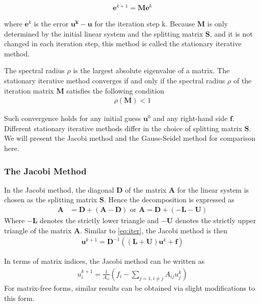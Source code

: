 \begin{align}
    \boldsymbol{e}^{k+1} = \boldsymbol{M} \boldsymbol{e}^k
\end{align}

where $\boldsymbol{e}^k$ is the error $\boldsymbol{u^k} - \boldsymbol{u}$ for the iteration step k. Because $\boldsymbol{M}$ is only determined by the initial linear system and the splitting matrix $\boldsymbol{S}$, and it is not changed in each iteration step, this method is called the stationary iterative method. 

The spectral radius $\rho$ is the largest absolute eigenvalue of a matrix. The stationary iterative method converges if and only if the spectral radius $\rho$ of the iteration matrix $\boldsymbol{M}$ satisfies the following condition
\begin{align}
    \rho(\boldsymbol{M}) < 1
\end{align}

Such convergence holds for any initial guess $\boldsymbol{u}^0$ and any right-hand side $\boldsymbol{f}$. Different stationary iterative methods differ in the choice of splitting matrix $\boldsymbol{S}$. We will present the Jacobi method and the Gauss-Seidel method for comparison here.


\subsubsection{The Jacobi Method}
In the Jacobi method, the diagonal $\boldsymbol{D}$ of the matrix $\boldsymbol{A}$ for the linear system is chosen as the splitting matrix $\boldsymbol{S}$. Hence the decomposition is expressed as
\begin{align}
    \boldsymbol{A} &= \boldsymbol{D} + (\boldsymbol{A} - \boldsymbol{D})  \text{ or } \boldsymbol{A} = \boldsymbol{D} + (-\boldsymbol{L} - \boldsymbol{U})
\end{align}
Where $-\boldsymbol{L}$ denotes the strictly lower triangle and $-\boldsymbol{U}$ denotes the strictly upper triangle of the matrix $\boldsymbol{A}$. Similar to \autoref{eq:iter}, the Jacobi method is then
\begin{align}
    \boldsymbol{u}^{k+1} = \boldsymbol{D}^{-1}((\boldsymbol{L} + \boldsymbol{U})\boldsymbol{u}^k + \boldsymbol{f})
\end{align}

In terms of matrix indices, the Jacobi method can be written as 
\begin{align}
    u_i^{k+1} = \frac{1}{A_{ii}} (f_i - \sum_{j=1,i\neq j}A_{ij}u_j^k)
\end{align}
For matrix-free forms, similar results can be obtained via slight modifications to this form.


